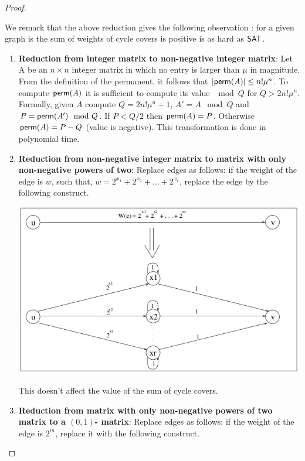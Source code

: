 \documentclass[11pt]{article}
\newcommand{\perm}{{\sf perm}}
\begin{document}
\begin{proof}
        \begin{remark}
        We remark that the above reduction gives the following observation : for a given graph is the sum of weights of cycle covers is positive is as hard as ${\mathsf{SAT}}$.
        \end{remark}
    \begin{enumerate}
        \item 
            {\bf Reduction from integer matrix to non-negative integer matrix}: Let A be an $n \times n$ integer matrix in which no entry is larger than $\mu$ in magnitude. From the definition of the permanent, it follows that $|\perm(A)| \leq n!\mu^n$. To compute $\perm(A)$
            it is sufficient to compute its value $\mod Q$ for $Q > 2n!\mu^n$. Formally, given $A$ compute $Q = 2n!\mu^n + 1$, $A' = A \mod Q$ and $P = \perm(A') \mod Q$. If $P < Q/2$ then $\perm(A) = P$. Otherwise $\perm(A) = P - Q$ (value is negative). This transformation is done in polynomial time.
        \item 
            {\bf Reduction from non-negative integer matrix to matrix with only non-negative powers of two}: Replace edges as follows: if the weight of the edge is $w$, such that, $w = 2^{x_1} + 2^{x_2}+\dots+2^{x_r}$, replace the edge by the following construct.
            \begin{center}
            \includegraphics[scale=.6]{reduction1.jpg}
            \end{center}
            This doesn't affect the value of the sum of cycle covers. 
        \item
            {\bf Reduction from  matrix with only non-negative powers of two matrix to a $(0,1)$- matrix}: Replace edges as follows: if the weight of the edge is $2^m$, replace it with the following construct.
                       \begin{center}

\end{center}
\end{enumerate}
\end{proof}
\end{document}
